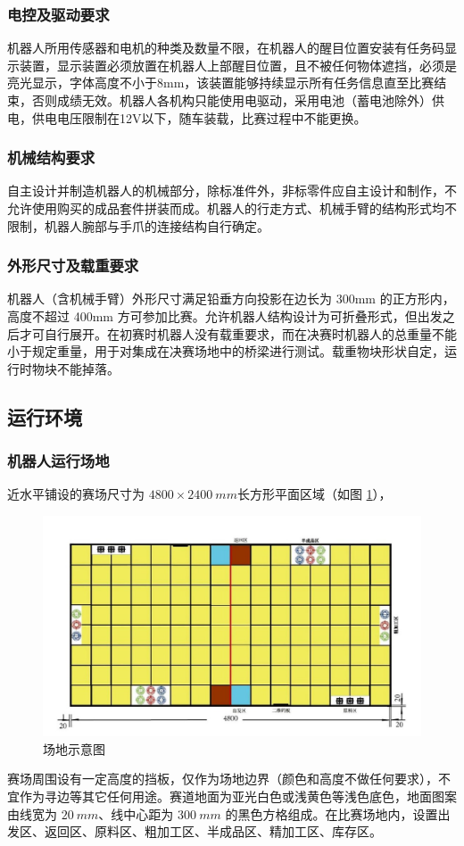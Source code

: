 \documentclass[a4paper,11pt,UTF8]{ctexart}
\begin{document}
\subsubsection{电控及驱动要求}
机器人所用传感器和电机的种类及数量不限，在机器人的醒目位置安装有任务码显示装置，显示装置必须放置在机器人上部醒目位置，且不被任何物体遮挡，必须是亮光显示，字体高度不小于8mm，该装置能够持续显示所有任务信息直至比赛结束，否则成绩无效。机器人各机构只能使用电驱动，采用电池（蓄电池除外）供电，供电电压限制在12V以下，随车装载，比赛过程中不能更换。
\subsubsection{机械结构要求}
自主设计并制造机器人的机械部分，除标准件外，非标零件应自主设计和制作，不允许使用购买的成品套件拼装而成。机器人的行走方式、机械手臂的结构形式均不限制，机器人腕部与手爪的连接结构自行确定。
\subsubsection{外形尺寸及载重要求}
机器人（含机械手臂）外形尺寸满足铅垂方向投影在边长为 300mm 的正方形内，高度不超过 400mm 方可参加比赛。允许机器人结构设计为可折叠形式，但出发之后才可自行展开。在初赛时机器人没有载重要求，而在决赛时机器人的总重量不能小于规定重量，用于对集成在决赛场地中的桥梁进行测试。载重物块形状自定，运行时物块不能掉落。
\subsection{运行环境}
\subsubsection{机器人运行场地}
近水平铺设的赛场尺寸为 $4800\times2400~mm$长方形平面区域（如图 \ref{fig_Field}），
\begin{figure}[htbp]
  \centering
  \includegraphics[width=12cm]{场地.jpg}
  \caption{场地示意图} \label{fig_Field}
\end{figure}
赛场周围设有一定高度的挡板，仅作为场地边界（颜色和高度不做任何要求），不宜作为寻边等其它任何用途。赛道地面为亚光白色或浅黄色等浅色底色，地面图案由线宽为 $20~mm$、线中心距为 $300~mm$ 的黑色方格组成。在比赛场地内，设置出发区、返回区、原料区、粗加工区、半成品区、精加工区、库存区。
\end{document}
